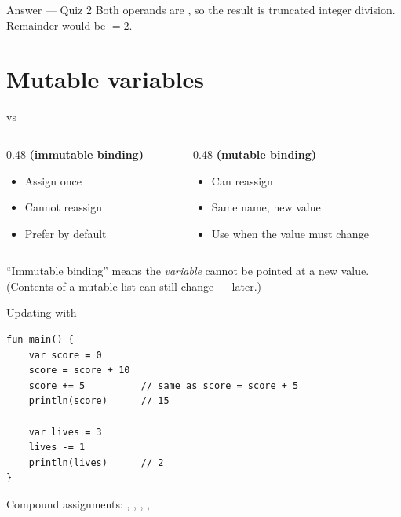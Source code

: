 \documentclass[aspectratio=169,11pt]{beamer}
\begin{document}
    \begin{frame}{Answer --- Quiz 2}
        \vspace{0.4em}
        Both operands are , so the result is truncated integer division.
        Remainder would be  $= 2$.
    \end{frame}

    \section{Mutable variables}

    \begin{frame}{ vs }
        \begin{columns}[T]
            \begin{column}{0.48\textwidth}
                \textbf{ (immutable binding)}
                \begin{itemize}
                    \item Assign once
                    \item Cannot reassign
                    \item Prefer by default
                \end{itemize}
            \end{column}
            \begin{column}{0.48\textwidth}
                \textbf{ (mutable binding)}
                \begin{itemize}
                    \item Can reassign
                    \item Same name, new value
                    \item Use when the value must change
                \end{itemize}
            \end{column}
        \end{columns}
        \vspace{0.8em}
        ``Immutable binding'' means the \emph{variable} cannot be pointed at a new value.
        (Contents of a mutable list can still change --- later.)
    \end{frame}

    \begin{frame}[fragile]{Updating with }
        \begin{lstlisting}
fun main() {
    var score = 0
    score = score + 10
    score += 5          // same as score = score + 5
    println(score)      // 15

    var lives = 3
    lives -= 1
    println(lives)      // 2
}
        \end{lstlisting}
        \vspace{0.3em}
        Compound assignments: \kotlincode{+=}, \kotlincode{-=}, \kotlincode{*=}, \kotlincode{/=}, \kotlincode{\%=}
    \end{frame}
\end{document}
